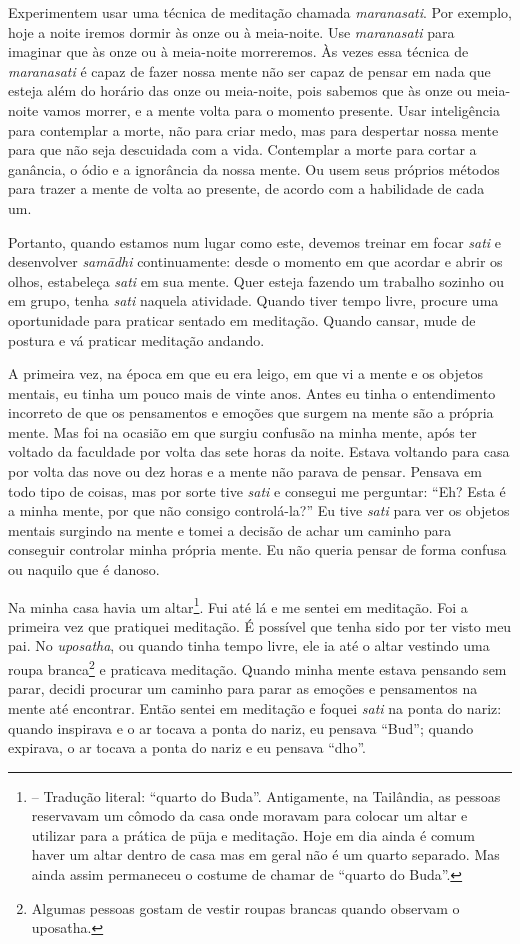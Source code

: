 Experimentem usar uma técnica de meditação chamada
\textit{maranasati}. Por exemplo, hoje a noite iremos dormir às onze ou
à meia-noite. Use \textit{maranasati} para imaginar que às onze ou à
meia-noite morreremos. Às vezes essa técnica de \textit{maranasati} é
capaz de fazer nossa mente não ser capaz de pensar em nada que esteja
além do horário das onze ou meia-noite, pois sabemos que às onze ou
meia-noite vamos morrer, e a mente volta para o momento presente. Usar
inteligência para contemplar a morte, não para criar medo, mas para
despertar nossa mente para que não seja descuidada com a vida.
Contemplar a morte para cortar a ganância, o ódio e a ignorância da
nossa mente. Ou usem seus próprios métodos para trazer a mente de volta
ao presente, de acordo com a habilidade de cada um.

Portanto, quando estamos num lugar como este, devemos treinar em
focar \textit{sati} e desenvolver \textit{samādhi} continuamente:
desde o momento em que acordar e abrir os olhos, estabeleça
\textit{sati} em sua mente. Quer esteja fazendo um trabalho sozinho ou
em grupo, tenha \textit{sati} naquela atividade. Quando tiver tempo
livre, procure uma oportunidade para praticar sentado em meditação.
Quando cansar, mude de postura e vá praticar meditação andando. 

A primeira vez, na época em que eu era leigo, em que vi a mente e os
objetos mentais, eu tinha um pouco mais de vinte anos. Antes eu tinha o
entendimento incorreto de que os pensamentos e emoções que surgem na
mente são a própria mente. Mas foi na ocasião em que surgiu confusão na
minha mente, após ter voltado da faculdade por volta das sete horas da
noite. Estava voltando para casa por volta das nove ou dez horas e a
mente não parava de pensar. Pensava em todo tipo de coisas, mas por
sorte tive \textit{sati} e consegui me perguntar: “Eh? Esta é a minha
mente, por que não consigo controlá-la?” Eu tive \textit{sati} para ver
os objetos mentais surgindo na mente e tomei a decisão de achar um
caminho para conseguir controlar minha própria mente. Eu não queria
pensar de forma confusa ou naquilo que é danoso.

Na minha casa havia um
altar\footnote{ – Tradução
literal: “quarto do Buda”. Antigamente, na Tailândia, as pessoas
reservavam um cômodo da casa onde moravam para colocar um altar e
utilizar para a prática de pūja e meditação. Hoje em dia ainda é
comum haver um altar dentro de casa mas em geral não é um quarto
separado. Mas ainda assim permaneceu o costume de chamar de “quarto do
Buda”.}. Fui até lá e me sentei em meditação. Foi a primeira vez que
pratiquei meditação. É possível que tenha sido por ter visto meu pai.
No \textit{uposatha}, ou quando tinha tempo livre, ele ia até o altar
vestindo uma roupa branca\footnote{Algumas pessoas gostam de vestir
roupas brancas quando observam o uposatha.} e praticava meditação.
Quando minha mente estava pensando sem parar, decidi procurar um
caminho para parar as emoções e pensamentos na mente até encontrar.
Então sentei em meditação e foquei \textit{sati} na ponta do nariz:
quando inspirava e o ar tocava a ponta do nariz, eu pensava “Bud”;
quando expirava, o ar tocava a ponta do nariz e eu pensava “dho”.

